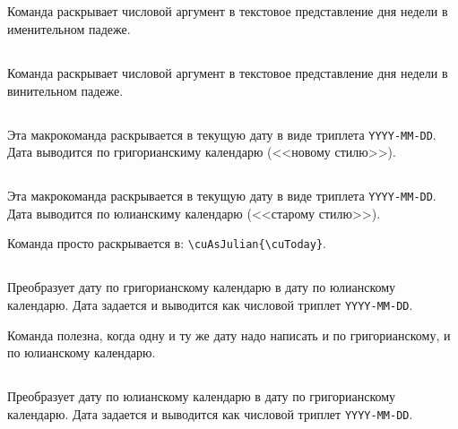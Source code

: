 \begin{RU}
\subsection{}
Команда раскрывает числовой аргумент в текстовое представление дня недели в именительном падеже.

\subsection{}
Команда раскрывает числовой аргумент в текстовое представление дня недели в винительном падеже.

\subsection{}
Эта макрокоманда раскрывается в текущую дату в виде триплета \texttt{YYYY-MM-DD}. Дата выводится по григорианскиму календарю (<<новому стилю>>).

\subsection{}
Эта макрокоманда раскрывается в текущую дату в виде триплета \texttt{YYYY-MM-DD}. Дата выводится по юлианскиму календарю (<<старому стилю>>).

Команда просто раскрывается в:  \verb+\cuAsJulian{\cuToday}+.

\subsection{}
Преобразует дату по григорианскому календарю в дату по юлианскому календарю.
Дата задается и выводится как числовой триплет \texttt{YYYY-MM-DD}.

Команда полезна, когда одну и ту же дату надо написать и по григорианскому, и по юлианскому календарю.

\subsection{}
Преобразует дату по юлианскому календарю в дату по григорианскому календарю. Дата задается и выводится как числовой триплет \texttt{YYYY-MM-DD}.

\end{RU}

